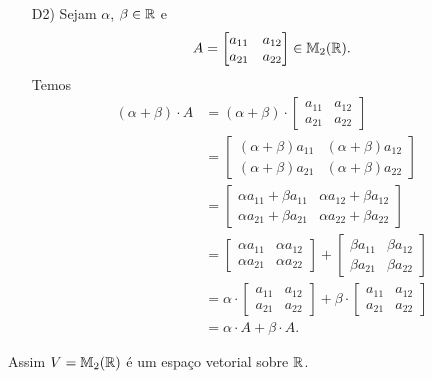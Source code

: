 \documentclass[12pt]{exam}
\begin{document}
\begin{itemize}
        \item[D2)] Sejam $\alpha$, $\beta \in \mathbb{R}$ e
        \[
        A = \begin{bmatrix} a_{11} & a_{12}\\a_{21} & a_{22}\end{bmatrix} \in \mathbb{M}_{2}(\mathbb{R}).
        \]
        Temos
        \begin{align*}
            (\alpha + \beta)\cdot A & = (\alpha + \beta)\cdot\begin{bmatrix} a_{11} & a_{12}\\a_{21} & a_{22}\end{bmatrix}
            \\ &= \begin{bmatrix} (\alpha + \beta)a_{11} & (\alpha + \beta)a_{12}\\(\alpha + \beta)a_{21} & (\alpha + \beta)a_{22}\end{bmatrix}
            \\ &= \begin{bmatrix} \alpha a_{11} + \beta a_{11} & \alpha a_{12} + \beta a_{12}\\\alpha a_{21} + \beta a_{21} & \alpha a_{22} + \beta a_{22}\end{bmatrix}
            \\ &= \begin{bmatrix} \alpha a_{11} & \alpha a_{12}\\ \alpha a_{21} & \alpha a_{22}\end{bmatrix}
            + \begin{bmatrix} \beta a_{11} & \beta a_{12}\\ \beta a_{21} & \beta a_{22}\end{bmatrix}
            \\ &= \alpha\cdot\begin{bmatrix} a_{11} & a_{12}\\a_{21} & a_{22}\end{bmatrix}  + \beta\cdot\begin{bmatrix} a_{11} & a_{12}\\a_{21} & a_{22}\end{bmatrix}
            \\ &= \alpha\cdot A + \beta\cdot A.
        \end{align*}
    \end{itemize}
    Assim $V = \mathbb{M}_{2}(\mathbb{R})$ é um espaço vetorial sobre $\mathbb{R}$.
\end{document}
